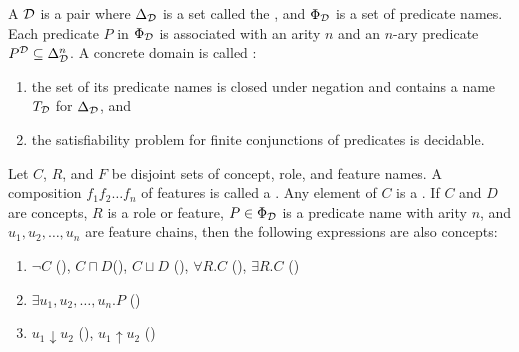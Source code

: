 \begin{defi}
A  $\mathcal{D}$ is a pair \tuple{\Delta_{\calD},\Phi_{\calD}} where $\Delta_{\mathcal{D}}$ is a set called the , and $\Phi_{\mathcal{D}}$ is a set of predicate names. Each predicate $P$ in $\Phi_{\mathcal{D}}$ is associated with an arity $n$ and an $n$-ary predicate $P^{\mathcal{D}}\subseteq\Delta_{\mathcal{D}}^n$. A concrete domain is called  \iffTx{}:
\begin{enumerate}
 \item the set of its predicate names is closed under negation and contains a name $T_{\mathcal{D}}$ for $\Delta_{\mathcal{D}}$, and
 \item the satisfiability problem for finite conjunctions of predicates is decidable.
\end{enumerate}
\cite{conf/ijcai/Lutz99}
\end{defi}

\begin{defi}
Let $C$, $R$, and $F$ be disjoint sets of concept, role, and feature names. A composition $f_1f_2\ldots f_n$ of features is called a . Any element of $C$ is a . If $C$ and $D$ are concepts, $R$ is a role or feature, $P\in\Phi_{\mathcal{D}}$ is a predicate name with arity $n$, and $u_1,u_2,\ldots,u_n$ are feature chains, then the following expressions are also concepts:
\begin{enumerate}
 \item $\neg C$ (), $C\sqcap D$(), $C\sqcup D$ (), $\forall R.C$ (), $\exists R.C$ ()
 \item $\exists u_1,u_2,\ldots,u_n.P$ ()
 \item $u_1\downarrow u_2$ (), $u_1\uparrow u_2$ ()
\end{enumerate}
\label{def:featurechain}
\cite{conf/ijcai/Lutz99}
\end{defi}

